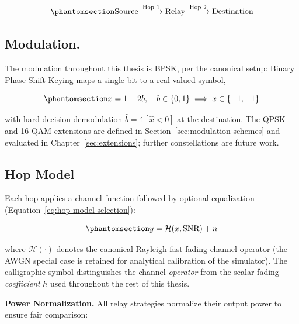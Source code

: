 \begin{equation}\protect\phantomsection\label{eq:two-hop-system}{\text{Source} \xrightarrow{\text{Hop 1}} \text{Relay} \xrightarrow{\text{Hop 2}} \text{Destination}
}\end{equation}

\subsection{Modulation.}\label{sec:modulation}
The modulation throughout this thesis is BPSK, per the canonical setup: Binary Phase-Shift Keying maps a single bit to a real-valued symbol,

\begin{equation}\protect\phantomsection\label{eq:bpsk-mapping}{x = 1 - 2b, \quad b \in \{0, 1\} \implies x \in \{-1, +1\}}\end{equation}

with hard-decision demodulation \(\hat{b} = \mathbb{1}[\hat{x} < 0]\) at the destination. The QPSK and 16-QAM extensions are defined in Section~\ref{sec:modulation-schemes} and evaluated in Chapter~\ref{sec:extensions}; further constellations are future work.




\subsection{Hop Model}\label{sec:hop-model}
Each hop applies a channel function followed by optional equalization (Equation~\ref{eq:hop-model-selection}):

\begin{equation}\protect\phantomsection\label{eq:hop-model-selection}{y = \mathcal{H}(x, \text{SNR}) + n}
\end{equation}


where \(\mathcal{H}(\cdot)\) denotes the canonical Rayleigh fast-fading channel operator (the AWGN special case is retained for analytical calibration of the simulator). The calligraphic symbol distinguishes the channel \emph{operator} from the scalar fading \emph{coefficient} \(h\) used throughout the rest of this thesis.

\textbf{Power Normalization.} All relay strategies normalize their output power to ensure fair comparison:

